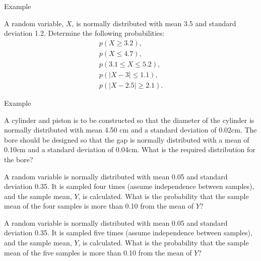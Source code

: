 \begin{frame}{Example}
  
  A random variable, $X$, is normally distributed with mean 3.5 and
  standard deviation 1.2. Determine the following probabilities:
  \begin{eqnarray*}
    p(X\geq 3.2), \\
    p(X \leq 4.7), \\
    p(3.1\leq X \leq 5.2), \\
    p(|X-3|\leq 1.1), \\
    p(|X-2.5|\geq 2.1).
  \end{eqnarray*}
  
\end{frame}

\begin{frame}{Example}

  A cylinder and piston is to be constructed so that the diameter of
  the cylinder is normally distributed with mean 4.50 cm and a
  standard deviation of 0.02cm. The bore should be designed so that
  the gap is normally distributed with a mean of 0.10cm and a standard
  deviation of 0.04cm. What is the required distribution for the bore?
  
\end{frame}

\begin{frame}
  A random variable is normally distributed with mean 0.05 and
  standard deviation 0.35. It is sampled four times (assume
  independence between samples), and the sample mean, $Y$, is
  calculated. What is the probability that the sample mean of the four
  samples is more than 0.10 from the mean of $Y$?
\end{frame}


\begin{frame}
  A random variable is normally distributed with mean 0.05 and
  standard deviation 0.35. It is sampled five times (assume
  independence between samples), and the sample mean, $Y$, is
  calculated. What is the probability that the sample mean of the five
  samples is more than 0.10 from the mean of $Y$?
\end{frame}


